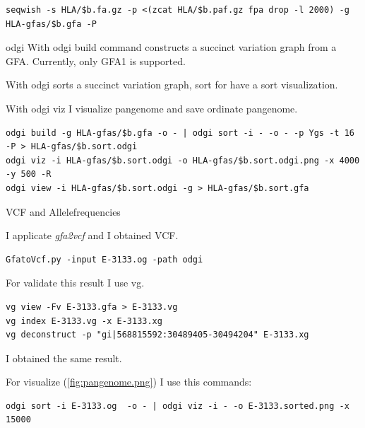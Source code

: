 \begin{verbatim}
seqwish -s HLA/$b.fa.gz -p <(zcat HLA/$b.paf.gz fpa drop -l 2000) -g HLA-gfas/$b.gfa -P
\end{verbatim}
  
\item odgi
With odgi build command constructs a succinct variation graph from a GFA. Currently, only GFA1 is supported.


With odgi sorts a succinct variation graph, sort for have a sort visualization.


With odgi viz I visualize pangenome and save ordinate pangenome. 

\begin{verbatim}
odgi build -g HLA-gfas/$b.gfa -o - | odgi sort -i - -o - -p Ygs -t 16 -P > HLA-gfas/$b.sort.odgi 
odgi viz -i HLA-gfas/$b.sort.odgi -o HLA-gfas/$b.sort.odgi.png -x 4000 -y 500 -R
odgi view -i HLA-gfas/$b.sort.odgi -g > HLA-gfas/$b.sort.gfa
\end{verbatim}

\item VCF and Allelefrequencies

I applicate \textit{gfa2vcf} and I obtained VCF.

\begin{verbatim}
GfatoVcf.py -input E-3133.og -path odgi
\end{verbatim}

For validate this result I use vg.

\begin{verbatim}
vg view -Fv E-3133.gfa > E-3133.vg
vg index E-3133.vg -x E-3133.xg
vg deconstruct -p "gi|568815592:30489405-30494204" E-3133.xg 
\end{verbatim}

I obtained the same result. 

For visualize (\ref{fig:pangenome.png}) I use this commands:

\begin{verbatim}
odgi sort -i E-3133.og  -o - | odgi viz -i - -o E-3133.sorted.png -x 15000
\end{verbatim}


  


